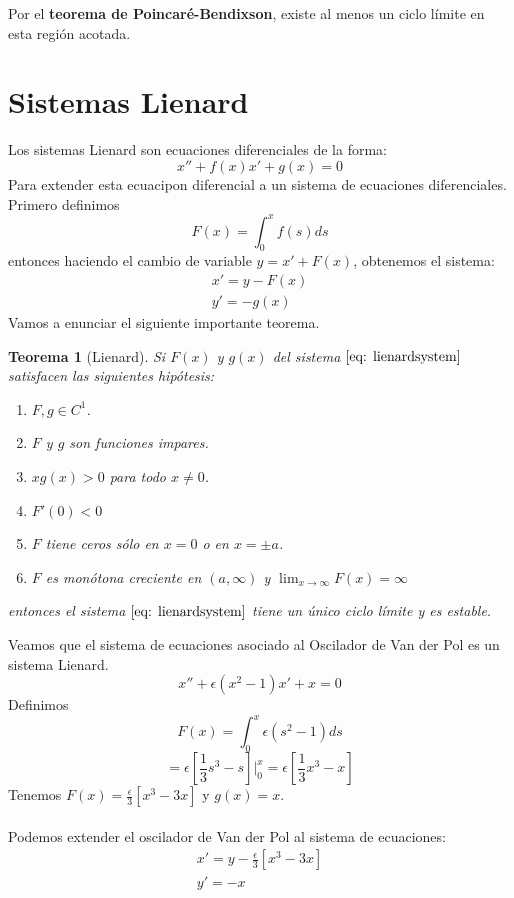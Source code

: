 \documentclass[12pt, a4paper]{report}
\newtheorem{theorem}{Teorema}
\begin{document}
Por el \textbf{teorema de Poincaré-Bendixson}, existe al menos un ciclo límite en esta región acotada.

\section{Sistemas Lienard}

Los sistemas Lienard son ecuaciones diferenciales de la forma:
\begin{equation}\label{eq: lienard}
	x''+f(x)x'+g(x)=0
\end{equation}
Para extender esta ecuacipon diferencial a un sistema de ecuaciones diferenciales. Primero definimos
$$F(x)=\int_0^xf(s)ds$$
entonces haciendo el cambio de variable $y=x'+F(x)$, obtenemos el sistema:
\begin{equation}\label{eq: lienardsystem}
	\begin{matrix}
		x'=y-F(x) \\
		y'=-g(x)
	\end{matrix}
\end{equation}
Vamos a enunciar el siguiente importante teorema.
\begin{theorem}[Lienard]
	Si $F(x)$ y $g(x)$ del sistema $\eqref{eq: lienardsystem}$ satisfacen las siguientes hipótesis:
	\begin{enumerate}
		\item $F,g\in C^1$.
		\item $F$ y $g$ son funciones impares.
		\item $xg(x)>0$ para todo $x\neq 0$.
		\item $F'(0)<0$
		\item $F$ tiene ceros sólo en $x=0$ o en $x=\pm a$.
		\item $F$ es monótona creciente en $(a,\infty)$ y $\lim_{x\to\infty}F(x)=\infty$
	\end{enumerate}
	entonces el sistema $\eqref{eq: lienardsystem}$ tiene un único ciclo límite y es estable.
\end{theorem}
Veamos que el sistema de ecuaciones asociado al Oscilador de Van der Pol es un sistema Lienard.
$$x''+\epsilon(x^2-1)x'+x=0$$
Definimos
$$F(x)=\int_0^x\epsilon(s^2-1)ds$$
$$=\epsilon[\frac{1}{3}s^3-s]| _0^x=\epsilon[\frac{1}{3}x^3-x]$$
Tenemos $F(x)=\frac{\epsilon}{3}[x^3-3x]$ y $g(x)=x$.\\
\\Podemos extender el oscilador de Van der Pol al sistema de ecuaciones:
$$
	\begin{matrix}
		x'=y-\frac{\epsilon}{3}[x^3-3x] \\
		y'=-x
	\end{matrix}
$$
\end{document}
